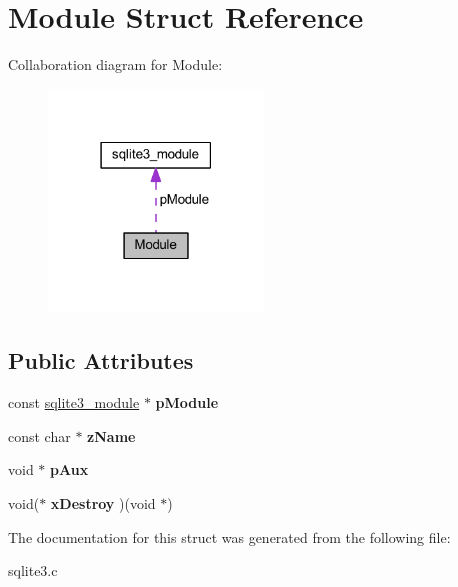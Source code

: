 \hypertarget{struct_module}{\section{Module Struct Reference}
\label{struct_module}
}


Collaboration diagram for Module\-:\nopagebreak
\begin{figure}[H]
\begin{center}
\leavevmode
\includegraphics[width=162pt]{struct_module__coll__graph}
\end{center}
\end{figure}
\subsection*{Public Attributes}
\begin{DoxyCompactItemize}
\item 
\hypertarget{struct_module_a65d2539d71ea028b505b2fb33563bfd7}{const \hyperlink{structsqlite3__module}{sqlite3\-\_\-module} $\ast$ {\bfseries p\-Module}}\label{struct_module_a65d2539d71ea028b505b2fb33563bfd7}

\item 
\hypertarget{struct_module_a45a5f5b43926b8ebf3e13e46a6534810}{const char $\ast$ {\bfseries z\-Name}}\label{struct_module_a45a5f5b43926b8ebf3e13e46a6534810}

\item 
\hypertarget{struct_module_ae3b827fee4c8b4f3ff38c86c2e2f48cd}{void $\ast$ {\bfseries p\-Aux}}\label{struct_module_ae3b827fee4c8b4f3ff38c86c2e2f48cd}

\item 
\hypertarget{struct_module_a4be509110a1a2f2c06a5d69af45704ca}{void($\ast$ {\bfseries x\-Destroy} )(void $\ast$)}\label{struct_module_a4be509110a1a2f2c06a5d69af45704ca}

\end{DoxyCompactItemize}


The documentation for this struct was generated from the following file\-:\begin{DoxyCompactItemize}
\item 
sqlite3.\-c\end{DoxyCompactItemize}
